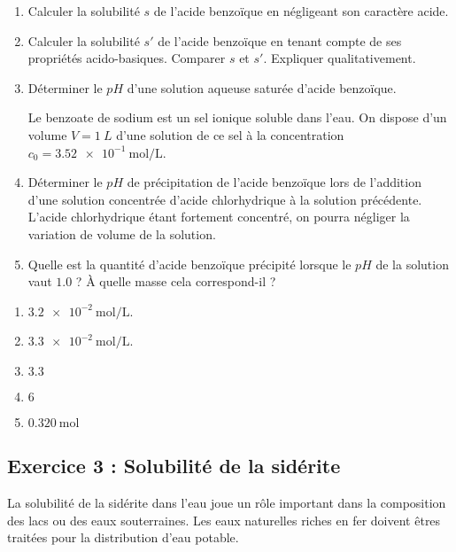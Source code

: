\begin{enumerate}
	\item Calculer la solubilité $s$ de l'acide benzoïque en négligeant son caractère acide.
	\item Calculer la solubilité $s'$ de l'acide benzoïque en tenant compte de ses propriétés acido-basiques. Comparer $s$ et $s'$. Expliquer qualitativement.
	\item Déterminer le $pH$ d'une solution aqueuse saturée d'acide benzoïque.
	
	Le benzoate de sodium est un sel ionique soluble dans l'eau. On dispose d'un volume $V = \SI{1}{L}$ d'une solution de ce sel à la concentration $c_0 = \SI{3.52e-1}{\mole\per\liter}$.
	
	\item Déterminer le $pH$ de précipitation de l'acide benzoïque lors de l'addition d'une solution concentrée d'acide chlorhydrique à la solution précédente. L'acide chlorhydrique étant fortement concentré, on pourra négliger la variation de volume de la solution.
	\item Quelle est la quantité d'acide benzoïque précipité lorsque le $pH$ de la solution vaut $1.0$ ? À quelle masse cela correspond-il ?
\end{enumerate}

\begin{enumerate}
	\item $\SI{3.2e-2}{\mole\per\liter}$.
	\item $\SI{3.3e-2}{\mole\per\liter}$.
	\item $3.3$
	\item $6$
	\item $\SI{0.320}{\mole}$
\end{enumerate}


\subsection{Exercice 3 : Solubilité de la sidérite}

La solubilité de la sidérite  dans l'eau joue un rôle important dans la composition des lacs ou des eaux souterraines. Les eaux naturelles riches en fer doivent êtres traitées pour la distribution d'eau potable. 


